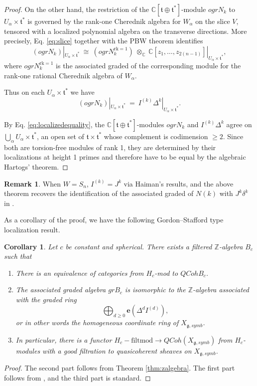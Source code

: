 \documentclass{amsart}
\numberwithin{equation}{section}
\newtheorem{corollary}[lemma]{Corollary}%
\theoremstyle{definition}
\newtheorem{remark}[lemma]{Remark}%
\newcommand{\fg}{\mathfrak{g}}
\newcommand{\ft}{\mathfrak{t}}
\newcommand{\C}{{\mathbb C}}
\newcommand{\Z}{{\mathbb Z}}
\newcommand{\e}{\mathbf{e}}
\begin{document}
\begin{proof}
On the other hand, the restriction of the $\C[\ft\oplus \ft^*]$-module $ogr N_k$ to $U_\alpha\times\ft^*$ is governed by the rank-one Cherednik algebra for $W_\alpha$ on the slice $V$, tensored with a localized polynomial algebra on the transverse directions. More precisely, Eq. \eqref{eq:slice} together with the PBW theorem identifies
    \[
    (ogr N_k)|_{U_\alpha\times\ft^*} \ \cong\
    (ogr N^{\mathrm{rk}=1}_k)\ \otimes_\C\ \C[z_1,\dots,z_{2(n-1)}]|_{U_\alpha\times\ft^*},
    \]
    where $ogr N^{\mathrm{rk}=1}_k$ is the associated graded of the corresponding module for the rank-one rational Cherednik algebra of $W_\alpha$.

    Thus on each $U_\alpha\times\ft^*$ we have
    \begin{equation}
    \label{eq:localizedequality}
    (ogr N_k)|_{U_\alpha\times\ft^*}
    \ =\
    I^{(k)}\Delta^k|_{U_\alpha\times\ft^*}.
    \end{equation}
    
    By Eq. \eqref{eq:localizedequality}, the $\C[\ft\oplus \ft^*]$-modules $ogr N_k$ and $I^{(k)}\Delta^k$ agree on $\bigcup_\alpha U_\alpha\times \ft^*$, an open set of $\ft\times\ft^*$ whose complement is codimension $\geq 2$. 
    Since both are torsion-free modules of rank 1, they are determined by their localizations at height 1 primes and therefore have to be equal by the algebraic Hartogs' theorem.
    

\end{proof}
    
\begin{remark}
\label{rem:GS-comparison}
When $W=S_n$, $I^{(k)}=J^k$ via Haiman's results, and the above theorem recovers the identification of the associated graded of $N(k)$ with $J^k\delta^k$ in \cite[Proposition~6.18]{GS1}. 
\end{remark}
As a corollary of the proof, we have the following Gordon--Stafford type localization result.
\begin{corollary}
Let $c$ be constant and spherical. There exists a filtered $\Z$-algebra $B_c$ such that
\begin{enumerate}
\item There is an equivalence of categories from 
$H_c$-mod to $QCoh B_c$.
\item The associated graded algebra $gr B_c$ is isomorphic to the $\Z$-algebra associated with the graded ring $$\bigoplus_{d\geq 0} \e (\Delta^d I^{(d)}),$$ or in other words the homogeneous coordinate ring of $X_{\fg, symb}$.
\item In particular, there is a functor $H_c-\text{filtmod}\to QCoh(X_{\fg,symb})$ from $H_c$-modules with a good filtration to quasicoherent sheaves on $X_{\fg,symb}$.
\end{enumerate}
\end{corollary}
\begin{proof}
The second part follows from Theorem \ref{thm:zalgebra}. The first part follows from \cite[Lemma 5.5]{GS1}, and the third part is standard.
\end{proof}
\end{document}
